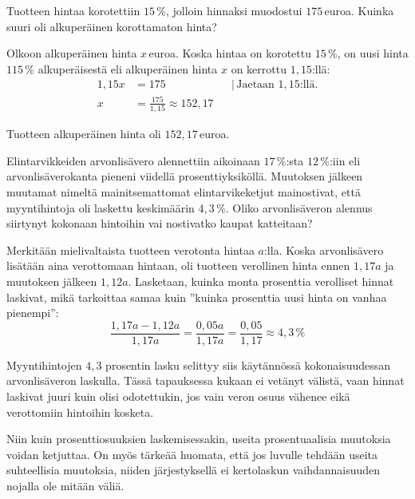 \begin{esimerkki}
Tuotteen hintaa korotettiin $15$\,\%, jolloin hinnaksi muodostui $175$\,euroa. Kuinka suuri oli alkuperäinen korottamaton hinta?
	\begin{esimratk}
Olkoon alkuperäinen hinta $x$\,euroa. Koska hintaa on korotettu $15$\,\%, on uusi hinta $115$\,\% alkuperäisestä eli alkuperäinen hinta $x$ on kerrottu $1,15$:llä:
\begin{align*}
	1,15x	&= 175	&	&|\, \text{Jaetaan } 1,15\text{:llä}.\\
	x	&= \frac{175}{1,15} \approx 152,17
\end{align*}
	\end{esimratk}
    \begin{esimvast}
    Tuotteen alkuperäinen hinta oli $152,17$\,euroa.
    \end{esimvast}
\end{esimerkki}


\begin{esimerkki}
Elintarvikkeiden arvonlisävero alennettiin aikoinaan $17$\,\%:sta $12$\,\%:iin eli arvonlisäverokanta pieneni viidellä prosenttiyksiköllä. Muutoksen jälkeen muutamat nimeltä mainitsemattomat elintarvikeketjut mainostivat, että myyntihintoja oli laskettu keskimäärin $4,3$\,\%. Oliko arvonlisäveron alennus siirtynyt kokonaan hintoihin vai nostivatko kaupat katteitaan?
	\begin{esimratk}
	Merkitään mielivaltaista tuotteen verotonta hintaa $a$:lla. Koska arvonlisävero lisätään aina verottomaan hintaan, oli tuotteen verollinen hinta ennen $1,17a$ ja muutoksen jälkeen $1,12a$. Lasketaan, kuinka monta prosenttia verolliset hinnat laskivat, mikä tarkoittaa samaa kuin ''kuinka prosenttia uusi hinta on vanhaa pienempi'':
$$\frac{1,17a-1,12a}{1,17a}=\frac{0,05a}{1,17a}=\frac{0,05}{1,17}\approx 4,3\,\%$$

Myyntihintojen $4,3$ prosentin lasku selittyy siis käytännössä kokonaisuudessan arvonlisäveron laskulla. Tässä tapauksessa kukaan ei vetänyt välistä, vaan hinnat laskivat juuri kuin olisi odotettukin, jos vain veron osuus vähenee eikä verottomiin hintoihin kosketa.
	\end{esimratk}
\end{esimerkki}

Niin kuin prosenttiosuuksien laskemisessakin, useita prosentuaalisia muutoksia voidan ketjuttaa. On myös tärkeää huomata, että jos luvulle tehdään useita suhteellisia muutoksia, niiden järjestyksellä ei kertolaskun vaihdannaisuuden nojalla ole mitään väliä.

